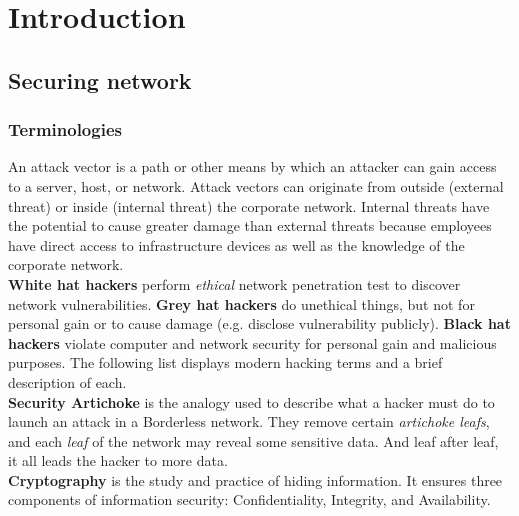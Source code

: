 \chapter{Introduction}

\section{Securing network}

\subsection{Terminologies}

An attack vector is a path or other means by which an attacker can gain access to a server, host, or network. Attack vectors can originate from outside (external threat) or inside (internal threat) the corporate network. Internal threats have the potential to cause greater damage than external threats because employees have direct access to infrastructure devices as well as the knowledge of the corporate network.\\

\textbf{White hat hackers} perform \emph{ethical} network penetration test to discover network vulnerabilities. \textbf{Grey hat hackers} do unethical things, but not for personal gain or to cause damage (e.g. disclose vulnerability publicly). \textbf{Black hat hackers} violate computer and network security for personal gain and malicious purposes. The following list displays modern hacking terms and a brief description of each.\\

\textbf{Security Artichoke} is the analogy used to describe what a hacker must do to launch an attack in a Borderless network. They  remove certain \emph{artichoke leafs}, and each \emph{leaf} of the network may reveal some sensitive data. And leaf after leaf, it all leads the hacker to more data.\\

\textbf{Cryptography} is the study and practice of hiding information. It ensures three components of information security: Confidentiality, Integrity, and Availability.\\

